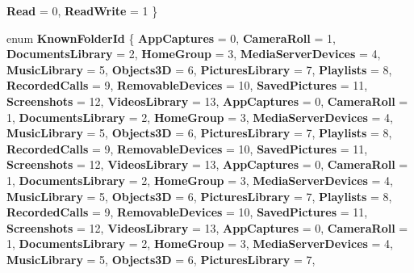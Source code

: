 \begin{DoxyCompactItemize}
{\bfseries Read} = 0, 
{\bfseries Read\+Write} = 1
 \}
\item 
\mbox{\label{namespace_windows_1_1_storage_ad806137f79e39155cbf64fd8e1e6de11}} 
enum {\bfseries Known\+Folder\+Id} \{ \newline
{\bfseries App\+Captures} = 0, 
{\bfseries Camera\+Roll} = 1, 
{\bfseries Documents\+Library} = 2, 
{\bfseries Home\+Group} = 3, 
\newline
{\bfseries Media\+Server\+Devices} = 4, 
{\bfseries Music\+Library} = 5, 
{\bfseries Objects3D} = 6, 
{\bfseries Pictures\+Library} = 7, 
\newline
{\bfseries Playlists} = 8, 
{\bfseries Recorded\+Calls} = 9, 
{\bfseries Removable\+Devices} = 10, 
{\bfseries Saved\+Pictures} = 11, 
\newline
{\bfseries Screenshots} = 12, 
{\bfseries Videos\+Library} = 13, 
{\bfseries App\+Captures} = 0, 
{\bfseries Camera\+Roll} = 1, 
\newline
{\bfseries Documents\+Library} = 2, 
{\bfseries Home\+Group} = 3, 
{\bfseries Media\+Server\+Devices} = 4, 
{\bfseries Music\+Library} = 5, 
\newline
{\bfseries Objects3D} = 6, 
{\bfseries Pictures\+Library} = 7, 
{\bfseries Playlists} = 8, 
{\bfseries Recorded\+Calls} = 9, 
\newline
{\bfseries Removable\+Devices} = 10, 
{\bfseries Saved\+Pictures} = 11, 
{\bfseries Screenshots} = 12, 
{\bfseries Videos\+Library} = 13, 
\newline
{\bfseries App\+Captures} = 0, 
{\bfseries Camera\+Roll} = 1, 
{\bfseries Documents\+Library} = 2, 
{\bfseries Home\+Group} = 3, 
\newline
{\bfseries Media\+Server\+Devices} = 4, 
{\bfseries Music\+Library} = 5, 
{\bfseries Objects3D} = 6, 
{\bfseries Pictures\+Library} = 7, 
\newline
{\bfseries Playlists} = 8, 
{\bfseries Recorded\+Calls} = 9, 
{\bfseries Removable\+Devices} = 10, 
{\bfseries Saved\+Pictures} = 11, 
\newline
{\bfseries Screenshots} = 12, 
{\bfseries Videos\+Library} = 13, 
{\bfseries App\+Captures} = 0, 
{\bfseries Camera\+Roll} = 1, 
\newline
{\bfseries Documents\+Library} = 2, 
{\bfseries Home\+Group} = 3, 
{\bfseries Media\+Server\+Devices} = 4, 
{\bfseries Music\+Library} = 5, 
\newline
{\bfseries Objects3D} = 6, 
{\bfseries Pictures\+Library} = 7, 

\end{DoxyCompactItemize}
